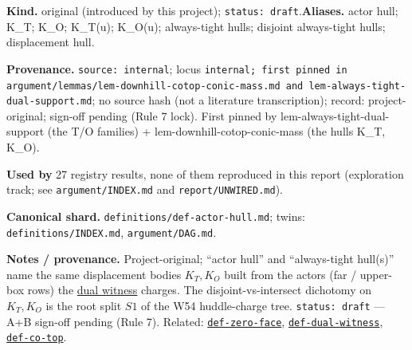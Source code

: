 \begin{defnote}
\textbf{Kind.} original (introduced by this project); \texttt{status: draft}.\quad\textbf{Aliases.} actor hull; K\_T; K\_O; K\_T(u); K\_O(u); always-tight hulls; disjoint always-tight hulls; displacement hull.
\par
\textbf{Provenance.} \texttt{source: internal}; locus \texttt{internal;\allowbreak{} first pinned in argument/\allowbreak{}lemmas/\allowbreak{}lem-\allowbreak{}downhill-\allowbreak{}cotop-\allowbreak{}conic-\allowbreak{}mass.\allowbreak{}md and lem-\allowbreak{}always-\allowbreak{}tight-\allowbreak{}dual-\allowbreak{}support.\allowbreak{}md}; no source hash (not a literature transcription); record: project-\allowbreak{}original;\allowbreak{} sign-\allowbreak{}off pending (Rule 7 lock).\allowbreak{} First pinned by lem-\allowbreak{}always-\allowbreak{}tight-\allowbreak{}dual-\allowbreak{}support (the T/\allowbreak{}O families) + lem-\allowbreak{}downhill-\allowbreak{}cotop-\allowbreak{}conic-\allowbreak{}mass (the hulls K\_T,\allowbreak{} K\_O).
\par
\textbf{Used by} 27 registry results, none of them reproduced in this report (exploration track; see \texttt{argument/INDEX.md} and \texttt{report/UNWIRED.md}).
\par
\textbf{Canonical shard.} \texttt{definitions/\allowbreak{}def-\allowbreak{}actor-\allowbreak{}hull.\allowbreak{}md}; twins: \texttt{definitions/INDEX.md}, \texttt{argument/DAG.md}.
\par
\textbf{Notes / provenance.} Project-original; ``actor hull'' and ``always-tight hull(s)'' name the same
displacement bodies $K_T,K_O$ built from the actors (far / upper-box rows) the
\hyperref[def:dual-witness]{dual witness} charges. The disjoint-vs-intersect dichotomy on $K_T,K_O$ is the
root split $S1$ of the W54 huddle-charge tree. \texttt{status:\allowbreak{} draft} --- A+B sign-off pending (Rule 7).
Related: \hyperref[def:zero-face]{\texttt{def-\allowbreak{}zero-\allowbreak{}face}}, \hyperref[def:dual-witness]{\texttt{def-\allowbreak{}dual-\allowbreak{}witness}}, \hyperref[def:co-top]{\texttt{def-\allowbreak{}co-\allowbreak{}top}}.
\end{defnote}

